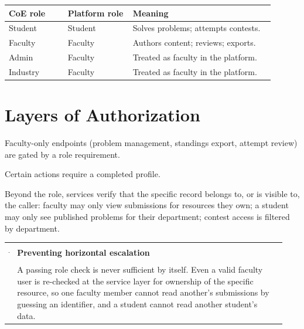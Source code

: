 \documentclass[12pt,a4paper,oneside]{report}
\makeatletter
\newenvironment{callout}[1]{\par\vspace{4pt}\noindent
  \begin{tabular}{@{}p{0.014\linewidth}@{\hspace{0.6em}}p{0.93\linewidth}@{}}
  \textcolor{boxframe}{\rule{2pt}{\baselineskip}} & \textbf{\textcolor{tcetblue}{#1}}\\[2pt] & }{\end{tabular}\par\vspace{6pt}}
\makeatother
\begin{document}
\begin{longtable}{@{}p{0.20\linewidth} p{0.22\linewidth} p{0.48\linewidth}@{}}
\toprule
\textbf{CoE role} & \textbf{Platform role} & \textbf{Meaning}\\
\midrule
\endhead
Student & Student & Solves problems; attempts contests.\\
Faculty & Faculty & Authors content; reviews; exports.\\
Admin & Faculty & Treated as faculty in the platform.\\
Industry & Faculty & Treated as faculty in the platform.\\
\bottomrule
\end{longtable}

\section{Layers of Authorization}
\begin{description}[leftmargin=1.6em,style=nextline]
  \item[Route-level role guards] Faculty-only endpoints (problem management,
        standings export, attempt review) are gated by a role requirement.
  \item[Profile-completion guard] Certain actions require a completed profile.
  \item[Ownership \& visibility checks in services] Beyond the role, services
        verify that the specific record belongs to, or is visible to, the caller:
        faculty may only view submissions for resources they own; a student may
        only see published problems for their department; contest access is
        filtered by department.
\end{description}

\begin{callout}{Preventing horizontal escalation}
A passing role check is never sufficient by itself. Even a valid faculty user is
re-checked at the service layer for ownership of the specific resource, so one
faculty member cannot read another's submissions by guessing an identifier, and a
student cannot read another student's data.
\end{callout}
\end{document}
